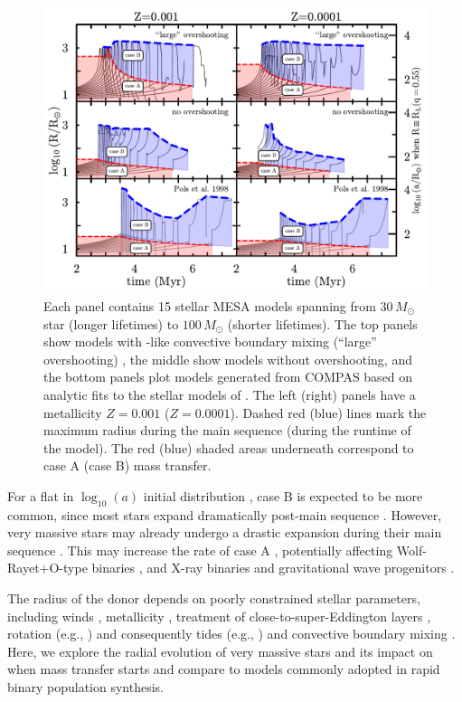 \documentclass[twocolumn]{aastex631}
\begin{document}
\begin{figure}[htbp]
  \centering
  \includegraphics[width=1.0\textwidth]{radii}
  \caption{Each panel contains 15 stellar \textsc{MESA} models spanning
    from $30 \, M_{\odot}$ star (longer lifetimes) to
    $100 \, M_{\odot}$ (shorter lifetimes). The top panels show models
    with \cite{brott:11}-like convective boundary mixing (``large''
    overshooting) \citep{claret:18}, the middle show models without
    overshooting, and the bottom panels plot models generated from
    \textsc{COMPAS} based on analytic fits to the stellar models of
    \cite{pols:98}. The left (right) panels have a metallicity
    $Z=0.001$ ($Z=0.0001$). Dashed red (blue) lines mark the maximum
    radius during the main sequence (during the runtime of the
    model). The red (blue) shaded areas underneath correspond to case
    A (case B) mass transfer.}
  \label{fig:radii}
\end{figure}


For a flat in $\log_{10}(a)$ initial distribution \citep{opik:24},
case B is expected to be more common, since most stars expand
dramatically post-main sequence
\citep[e.g.,][]{vandenheuvel:69}. However, very massive stars may
already undergo a drastic expansion during their main sequence
\citep[e.g.,][]{sanyal:15, jiang:15}. This may increase the rate of
case A \citep{demink:08}, potentially affecting Wolf-Rayet+O-type
binaries \citep[e.g.,][]{nuijten:24}, and X-ray binaries and
gravitational wave progenitors \citep[e.g.,][]{mandel:22}.

The radius of the donor depends on poorly constrained stellar
parameters, including winds \citep{renzo:17, josiek:24}, metallicity
\citep{xin:22}, treatment of close-to-super-Eddington layers
\citep[e.g.,][]{joss:73, paxton:13, jiang:15, agrawal:22, jermyn:23},
rotation (e.g., \citealt{maeder:00}) and consequently tides (e.g.,
\citealt{fabry:22}) and convective boundary mixing \citep{anders:23,
  johnston:24}. Here, we explore the radial evolution of very massive
stars and its impact on when mass transfer starts and compare to
models commonly adopted in rapid binary population synthesis.
\end{document}
